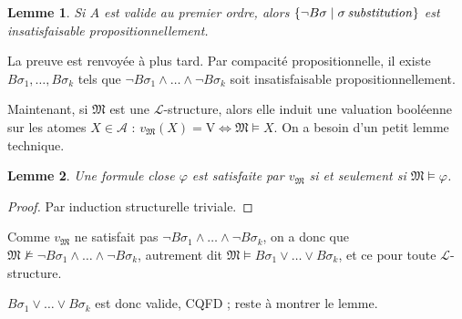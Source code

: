 \documentclass[a4paper, 11pt]{article}
\newtheorem*{lemma}{Lemme}
\begin{document}
\begin{lemma}
  Si $A$ est valide au premier ordre, alors $\{\lnot B\sigma \mid \sigma\,
  \text{\emph{substitution}} \}$ est insatisfaisable propositionnellement.
\end{lemma}

La preuve est renvoyée à plus tard. Par compacité propositionnelle, il existe
$B\sigma_1, \ldots, B\sigma_k$ tels que $\lnot B\sigma_1 \land \ldots \land
\lnot B\sigma_k$ soit insatisfaisable propositionnellement.

Maintenant, si $\mathfrak{M}$ est une $\mathcal{L}$-structure, alors elle induit
une valuation booléenne sur les atomes $X \in \mathcal{A}$ :
$v_{\mathfrak{M}}(X) = \mathrm{V} \Leftrightarrow \mathfrak{M} \models X$. On a
besoin d'un petit lemme technique.

\begin{lemma}
  Une formule close $\varphi$ est satisfaite par $v_{\mathfrak{M}}$ si et
  seulement si $\mathfrak{M} \models \varphi$.
\end{lemma}
\begin{proof}
  Par induction structurelle triviale.
\end{proof}


Comme $v_{\mathfrak{M}}$ ne satisfait pas $\lnot B\sigma_1 \land \ldots \land
\lnot B\sigma_k$, on a donc que $\mathfrak{M} \nvDash \lnot B\sigma_1 \land
\ldots \land \lnot B\sigma_k$, autrement dit $\mathfrak{M} \models B\sigma_1
\lor \ldots \lor B\sigma_k$, et ce pour toute $\mathcal{L}$-structure.

$B\sigma_1 \lor \ldots \lor B\sigma_k$ est donc valide, CQFD ; reste à montrer
le lemme.
\end{document}
